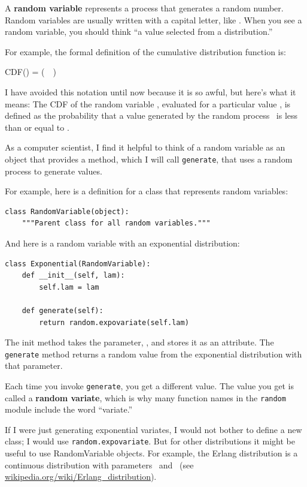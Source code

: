 \documentclass[12pt]{book}
\begin{document}
A {\bf random variable} represents a process that generates a random
number.  Random variables are usually written with a capital letter,
like \X.  When you see a random variable, you should think ``a value
selected from a distribution.''

For example, the formal definition of the cumulative distribution
function is:

\quad CDF(\x) = \Prob(\X~\myle~\x)

I have avoided this notation until now because it is so awful, but
here's what it means: The CDF of the random variable \X, evaluated
for a particular value \x, is defined as the probability that
a value generated by the random process \X~is less than or equal
to \x.

As a computer scientist, I find it helpful to think of a random
variable as an object that provides a method, which I will call
{\tt generate}, that uses a random process to generate values.

For example, here is a definition for a class that represents
random variables:
%
\begin{verbatim}
class RandomVariable(object):
    """Parent class for all random variables."""
\end{verbatim}

And here is a random variable with an exponential distribution:
%
\begin{verbatim}
class Exponential(RandomVariable):
    def __init__(self, lam):
        self.lam = lam

    def generate(self):
        return random.expovariate(self.lam)
\end{verbatim}

The init method takes the parameter, \mylambda, and stores it as
an attribute.  The {\tt generate} method returns a random value
from the exponential distribution with that parameter.

Each time you invoke {\tt generate}, you get a different value.  The
value you get is called a {\bf random variate}, which is why many
function names in the {\tt random} module include the word ``variate.''

If I were just generating exponential variates, I would not bother to
define a new class; I would use {\tt random.expovariate}.  But for
other distributions it might be useful to use RandomVariable objects.
For example, the Erlang distribution is a continuous distribution with
parameters \mylambda~and \kk~(see
\url{wikipedia.org/wiki/Erlang_distribution}).
\end{document}
